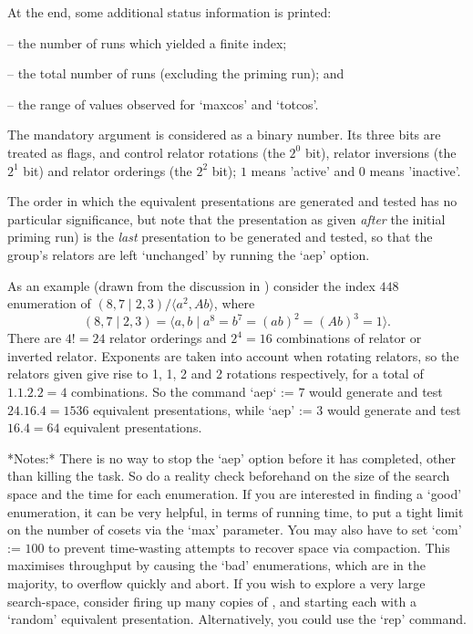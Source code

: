 At the end, some additional status information is printed: 

\beginitems

\item{--}  the number of runs which yielded a finite index; 
\item{--}  the total number of runs (excluding the priming run); and 
\item{--}  the range of values observed for `maxcos' and `totcos'.

\enditems

The mandatory  argument is considered  as a binary number.   Its three
bits are  treated as flags,  and control relator rotations  (the $2^0$
bit), relator  inversions (the $2^1$  bit) and relator  orderings (the
$2^2$ bit); $1$ means 'active' and $0$ means 'inactive'.

The  order in  which the  equivalent presentations  are  generated and
tested has no particular  significance, but note that the presentation
as  given {\it  after}  the initial  priming  run) is  the {\it  last}
presentation to be generated and  tested, so that the group's relators
are left `unchanged' by running the `aep' option.

As an example (drawn from the discussion in \cite{HR1}) consider the index
  $448$ enumeration of $(8,7 \mid 2,3) / \langle a^2,Ab \rangle$,
  where $$ (8,7 \mid 2,3) 
    = \langle a,b \mid a^8 = b^7 = (ab)^2 = (Ab)^3 = 1 \rangle . $$
There are $4!=24$ relator orderings and $2^4=16$ combinations of relator or
inverted relator.
Exponents are taken into account when rotating relators, so the relators
given give rise to 1, 1, 2 and 2 rotations respectively, for a total
of $1.1.2.2=4$ combinations.
So the command `aep` := $7$ would generate and test $24.16.4=1536$ 
equivalent presentations, while `aep' := $3$ would generate and test 
$16.4=64$ equivalent presentations.

*Notes:*
There is  no way  to stop  the `aep' option  before it  has completed,
other than killing the task.  So  do a reality check beforehand on the
size of  the search space and  the time for each  enumeration.  If you
are  interested  in finding  a  `good'  enumeration,  it can  be  very
helpful, in terms of running time,  to put a tight limit on the number
of cosets via the `max' parameter.
You may also have to set `com' := $100$ to prevent time-wasting attempts
to recover space via compaction.
This maximises throughput by causing the `bad' enumerations, which are in
the majority, to overflow quickly and abort.
If you wish to explore a very large search-space, consider firing up many
copies of {\ACE}, and starting each with a `random' equivalent
presentation.
Alternatively, you could use the `rep' command.

